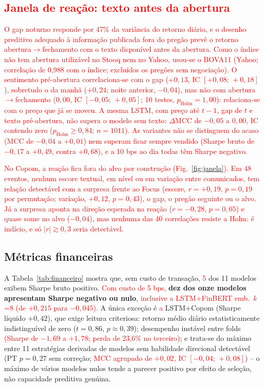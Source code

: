 \documentclass[conference]{IEEEtran}
\newcommand{\novo}[1]{\textcolor{red}{#1}}
\begin{document}
\subsection{\novo{Janela de rea\c{c}\~ao: texto antes da abertura}}
\label{sec:janela}
\novo{O gap noturno responde por 47\% da vari\^ancia do retorno di\'ario, e o desenho preditivo adequado \`a informa\c{c}\~ao publicada fora do preg\~ao prev\^e o retorno abertura$\to$fechamento com o texto dispon\'ivel antes da abertura. Como o \'indice n\~ao tem abertura utiliz\'avel no Stooq nem no Yahoo, usou-se o BOVA11 (Yahoo; correla\c{c}\~ao de 0,988 com o \'indice; exclu\'idos os preg\~oes sem negocia\c{c}\~ao). O sentimento pr\'e-abertura correlaciona-se com o gap ($+0{,}13$, IC $[+0{,}08;\,+0{,}18]$), sobretudo o da manh\~a ($+0{,}24$; noite anterior, $-0{,}04$), mas n\~ao com abertura$\to$fechamento ($0{,}00$, IC $[-0{,}05;\,+0{,}05]$; 10 testes, $p_{\mathrm{Holm}}=1{,}00$): relaciona-se com o pre\c{c}o que j\'a se moveu. A mesma LSTM, com pre\c{c}o at\'e $t-1$, gap de $t$ e texto pr\'e-abertura, n\~ao supera o modelo sem texto: $\Delta$MCC de $-0{,}05$ a $0{,}00$, IC contendo zero ($p_{\mathrm{Holm}}\ge0{,}84$; $n=1011$). As variantes n\~ao se distinguem do acaso (MCC de $-0{,}04$ a $+0{,}01$) nem superam ficar sempre vendido (Sharpe bruto de $-0{,}17$ a $+0{,}49$, contra $+0{,}68$), e a 10 bps ao dia todas t\^em Sharpe negativo.}

\novo{No Copom, a rea\c{c}\~ao fica fora do alvo por constru\c{c}\~ao (Fig.~\ref{fig:janela}). Em 48 eventos, nenhum escore textual, em n\'ivel ou em varia\c{c}\~ao entre comunicados, tem rela\c{c}\~ao detect\'avel com a surpresa frente ao Focus (escore, $r=+0{,}19$, $p=0{,}19$ por permuta\c{c}\~ao; varia\c{c}\~ao, $+0{,}12$, $p=0{,}43$), o gap, o preg\~ao seguinte ou o alvo. J\'a a surpresa aponta na dire\c{c}\~ao esperada na rea\c{c}\~ao ($r=-0{,}28$, $p=0{,}05$) e quase some no alvo ($-0{,}04$), mas nenhuma das 40 correla\c{c}\~oes resiste a Holm: \'e ind\'icio, e s\'o $|r|\gtrsim0{,}3$ seria detect\'avel.}

\subsection{M\'etricas financeiras}
\label{sec:financeiro-discussao}
A Tabela~\ref{tab:financeiro} mostra que, sem custo de transa\c{c}\~ao, \novo{5} dos 11 modelos exibem Sharpe bruto positivo. \novo{Com custo de 5 bps,} \textbf{dez dos onze modelos apresentam Sharpe negativo ou nulo}, \novo{inclusive a LSTM+FinBERT emb.\ $k$=8 (de $+0{,}215$ para $-0{,}045$).} A \'unica exce\c{c}\~ao \'e \novo{a} LSTM+Copom (Sharpe l\'iquido $+0{,}42$), que exige leitura criteriosa: retorno m\'edio di\'ario estatisticamente indistingu\'ivel de zero ($t=0{,}86$, $p\approx0{,}39$); desempenho inst\'avel entre folds \novo{(Sharpe de $-1{,}69$ a $+1{,}78$; perda de 23,6\% no terceiro)}; e trata-se do m\'aximo entre 11 estrat\'egias derivadas de modelos sem habilidade direcional detect\'avel (PT $p=0{,}27$ sem corre\c{c}\~ao; \novo{MCC agrupado de $+0{,}02$, IC $[-0{,}04;\,+0{,}08]$}) -- o m\'aximo de v\'arios modelos nulos tende a parecer positivo por efeito de sele\c{c}\~ao, n\~ao capacidade preditiva gen\'uina.
\end{document}

